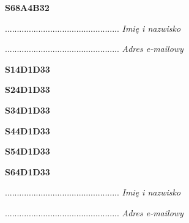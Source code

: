 \begin{turn}{90}\huge \textbf{S68A4B32}\end{turn}

\begin{turn}{90}\begin{minipage}{\linewidth} \vspace{20mm} ................................................  \textit{Imię i nazwisko}\end{minipage}\end{turn}

\begin{turn}{90}\begin{minipage}{\linewidth} \vspace{20mm} ................................................  \textit{Adres e-mailowy}\end{minipage}\end{turn}

\begin{turn}{90}\huge \textbf{S14D1D33}\end{turn}

\begin{turn}{90}\huge \textbf{S24D1D33}\end{turn}

\begin{turn}{90}\huge \textbf{S34D1D33}\end{turn}

\begin{turn}{90}\huge \textbf{S44D1D33}\end{turn}

\begin{turn}{90}\huge \textbf{S54D1D33}\end{turn}

\begin{turn}{90}\huge \textbf{S64D1D33}\end{turn}

\begin{turn}{90}\begin{minipage}{\linewidth} \vspace{20mm} ................................................  \textit{Imię i nazwisko}\end{minipage}\end{turn}

\begin{turn}{90}\begin{minipage}{\linewidth} \vspace{20mm} ................................................  \textit{Adres e-mailowy}\end{minipage}\end{turn}

